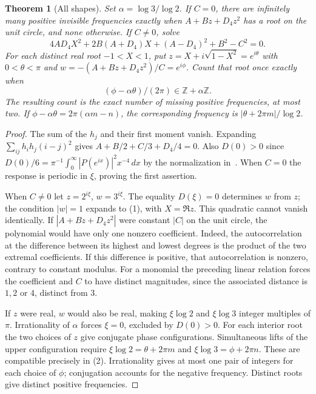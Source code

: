 \documentclass[11pt,letterpaper]{article}
\newtheorem{theorem}{Theorem}
\begin{document}
\begin{theorem}[All shapes]
Set $\alpha=\log3/\log2$. If $C=0$, there are infinitely many positive invisible frequencies exactly when $A+Bz+D_4z^2$ has a root on the unit circle, and none otherwise. If $C\ne0$, solve
\[
 4AD_4 X^2+2B(A+D_4)X+(A-D_4)^2+B^2-C^2=0.
 \tag{1}\label{eq:poly}
\]
For each distinct real root $-1<X<1$, put $z=X+i\sqrt{1-X^2}=e^{i\theta}$ with $0<\theta<\pi$ and $w=-(A+Bz+D_4z^2)/C=e^{i\phi}$. Count that root once exactly when
\[
 (\phi-\alpha\theta)/(2\pi)\in\mathbb Z+\alpha\mathbb Z. \tag{2}\label{eq:group}
\]
The resulting count is the exact number of missing positive frequencies, at most two. If $\phi-\alpha\theta=2\pi(\alpha m-n)$, the corresponding frequency is $|\theta+2\pi m|/\log 2$.
\end{theorem}
\begin{proof}
The sum of the $h_j$ and their first moment vanish. Expanding $\sum_{ij}h_ih_j(i-j)^2$ gives $A+B/2+C/3+D_4/4=0$. Also $D(0)>0$ since $D(0)/6=\pi^{-1}\int_0^\infty|P(e^{ix})|^2 x^{-4}\,dx$ by the normalization in~\cite{prior}. When $C=0$ the response is periodic in $\xi$, proving the first assertion.

When $C\ne0$ let $z=2^{i\xi}$, $w=3^{i\xi}$. The equality $D(\xi)=0$ determines $w$ from $z$; the condition $|w|=1$ expands to (1), with $X=\Re z$. This quadratic cannot vanish identically. If $|A+Bz+D_4z^2|$ were constant $|C|$ on the unit circle, the polynomial would have only one nonzero coefficient. Indeed, the autocorrelation at the difference between its highest and lowest degrees is the product of the two extremal coefficients. If this difference is positive, that autocorrelation is nonzero, contrary to constant modulus. For a monomial the preceding linear relation forces the coefficient and $C$ to have distinct magnitudes, since the associated distance is $1,2$ or $4$, distinct from $3$.

If $z$ were real, $w$ would also be real, making $\xi\log2$ and $\xi\log3$ integer multiples of $\pi$. Irrationality of $\alpha$ forces $\xi=0$, excluded by $D(0)>0$. For each interior root the two choices of $z$ give conjugate phase configurations. Simultaneous lifts of the upper configuration require $\xi\log2=\theta+2\pi m$ and $\xi\log3=\phi+2\pi n$. These are compatible precisely in (2). Irrationality gives at most one pair of integers for each choice of $\phi$; conjugation accounts for the negative frequency. Distinct roots give distinct positive frequencies.
\end{proof}
\end{document}
